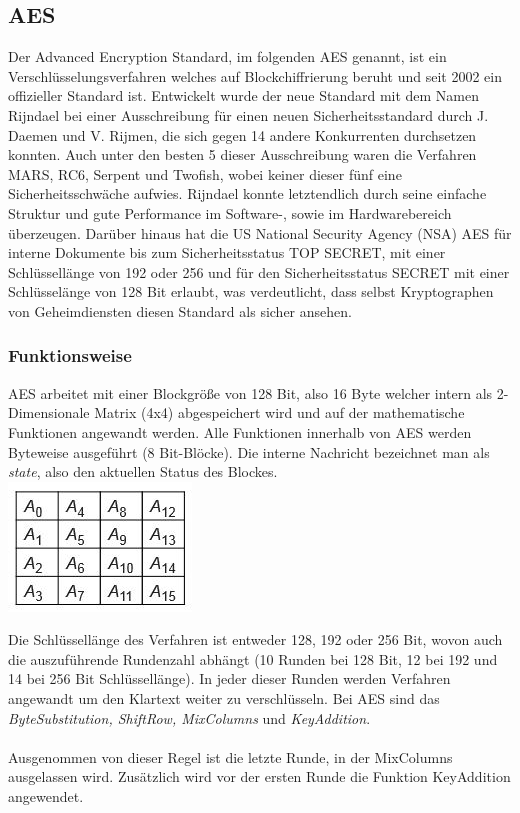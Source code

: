 \documentclass[10pt, a4paper,headsepline]{scrreprt}
\begin{document}
\subsection{AES}
Der Advanced Encryption Standard, im folgenden AES genannt, ist ein Verschlüsselungsverfahren welches auf Blockchiffrierung beruht und seit 2002 ein offizieller Standard ist. Entwickelt wurde der neue Standard mit dem Namen Rijndael bei einer Ausschreibung für einen neuen Sicherheitsstandard durch J. Daemen und V. Rijmen, die sich gegen 14 andere Konkurrenten durchsetzen konnten. Auch unter den besten 5 dieser Ausschreibung waren die Verfahren MARS, RC6, Serpent und Twofish, wobei keiner dieser fünf eine Sicherheitsschwäche aufwies. Rijndael konnte letztendlich durch seine einfache Struktur und gute Performance im Software-, sowie im Hardwarebereich überzeugen. %
Darüber hinaus hat die US National Security Agency (NSA) AES für interne Dokumente bis zum Sicherheitsstatus TOP SECRET, mit einer Schlüssellänge von 192 oder 256 und für den Sicherheitsstatus SECRET mit einer Schlüsselänge von 128 Bit erlaubt, was verdeutlicht, dass selbst Kryptographen von Geheimdiensten diesen Standard als sicher ansehen. %


\subsubsection{Funktionsweise}
AES arbeitet mit einer Blockgröße von 128 Bit, also 16 Byte welcher intern als 2-Dimensionale Matrix (4x4) abgespeichert wird und auf der mathematische Funktionen angewandt werden.
Alle Funktionen innerhalb von AES werden Byteweise ausgeführt (8 Bit-Blöcke).  Die interne Nachricht bezeichnet man als \textit{state}, also den aktuellen Status des Blockes. \\

\includegraphics[scale=0.5]{aes_state.JPG} 
\hfill

Die Schlüssellänge des Verfahren ist entweder 128, 192 oder 256 Bit, wovon auch die auszuführende Rundenzahl abhängt (10 Runden bei 128 Bit, 12 bei 192 und 14 bei 256 Bit Schlüssellänge). In jeder dieser Runden werden Verfahren angewandt um den Klartext weiter zu verschlüsseln. Bei AES sind das \textit{ByteSubstitution, ShiftRow, MixColumns} und \textit{KeyAddition}. \\ \\
Ausgenommen von dieser Regel ist die letzte Runde, in der MixColumns ausgelassen wird. %
Zusätzlich wird vor der ersten Runde die Funktion KeyAddition angewendet. %
\end{document}
